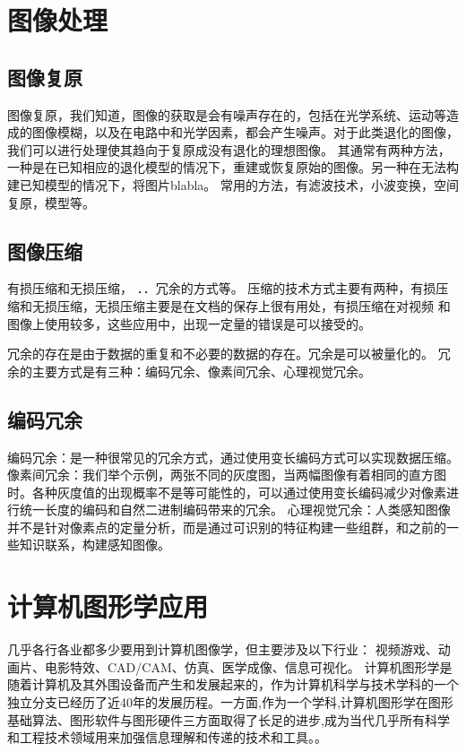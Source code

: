 \documentclass[UTF8]{article}
\begin{document}
\section{图像处理}
\subsection{ 图像复原}
图像复原，我们知道，图像的获取是会有噪声存在的，包括在光学系统、运动等造成的图像模糊，以及在电路中和光学因素，都会产生噪声。对于此类退化的图像，我们可以进行处理使其趋向于复原成没有退化的理想图像。
其通常有两种方法，一种是在已知相应的退化模型的情况下，重建或恢复原始的图像。另一种在无法构建已知模型的情况下，将图片blabla。
常用的方法，有滤波技术，小波变换，空间复原，模型等。
\subsection{图像压缩}

有损压缩和无损压缩， ．．冗余的方式等。
压缩的技术方式主要有两种，有损压缩和无损压缩，无损压缩主要是在文档的保存上很有用处，有损压缩在对视频
和图像上使用较多，这些应用中，出现一定量的错误是可以接受的。

冗余的存在是由于数据的重复和不必要的数据的存在。冗余是可以被量化的。
冗余的主要方式是有三种：编码冗余、像素间冗余、心理视觉冗余。
\subsection{编码冗余}
编码冗余：是一种很常见的冗余方式，通过使用变长编码方式可以实现数据压缩。
像素间冗余：我们举个示例，两张不同的灰度图，当两幅图像有着相同的直方图时。各种灰度值的出现概率不是等可能性的，可以通过使用变长编码减少对像素进行统一长度的编码和自然二进制编码带来的冗余。
心理视觉冗余：人类感知图像并不是针对像素点的定量分析，而是通过可识别的特征构建一些组群，和之前的一些知识联系，构建感知图像。

\section{计算机图形学应用}
几乎各行各业都多少要用到计算机图像学，但主要涉及以下行业：
视频游戏、动画片、电影特效、CAD/CAM、仿真、医学成像、信息可视化。 计算机图形学是随着计算机及其外围设备而产生和发展起来的，作为计算机科学与技术学科的一个独立分支已经历了近40年的发展历程。一方面,作为一个学科,计算机图形学在图形基础算法、图形软件与图形硬件三方面取得了长足的进步,成为当代几乎所有科学和工程技术领域用来加强信息理解和传递的技术和工具。。
\end{document}
